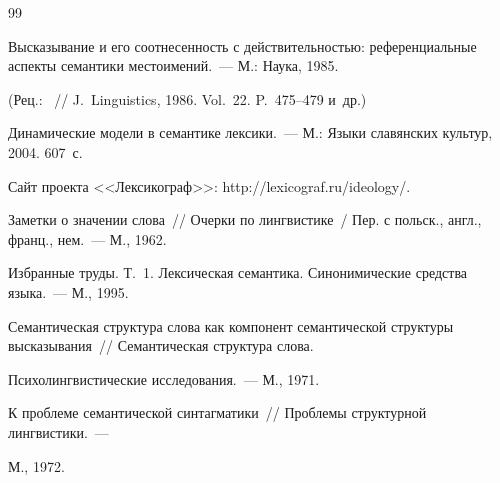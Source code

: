 {{\begin{thebibliography}{99}


Высказывание и его соотнесенность с действительностью: референциальные аспекты семантики местоимений.~--- М.: Наука, 1985. 


(Рец.: ~/\!\!/ J.~Linguistics, 1986. Vol.~22. P.~475--479 и~др.) 











Динамические модели в семантике лексики.~--- М.: Языки славянских культур, 2004. 607~с. 







Сайт проекта <<Лексикограф>>: {\sf http://lexicograf.ru/ideology/}.









Заметки о значении слова~/\!\!/  Очерки по лингвистике~/ Пер. с польск., англ., франц., нем.~--- М., 1962.









Избранные труды. Т.~1. Лексическая семантика. Синонимические средства языка.~--- М., 1995.









Семантическая структура слова как компонент семантической структуры высказывания~/\!\!/ Семантическая структура слова. 


Психолингвистические исследования.~--- М., 1971.









К проблеме семантической синтагматики~/\!\!/ Проблемы структурной лингвистики.~--- 


М., 1972.






\end{thebibliography}}}
